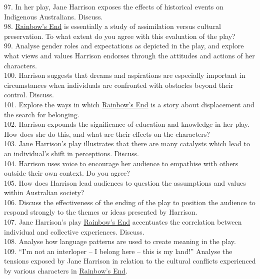 \documentclass[a4paper]{article}
\begin{document}
97. In her play, Jane Harrison exposes the effects of historical events on Indigenous Australians. Discuss.\\

98. \underline{Rainbow’s End} is essentially a study of assimilation versus cultural preservation. To what extent do you agree with this evaluation of the play?\\

99. Analyse gender roles and expectations as depicted in the play, and explore what views and values Harrison endorses through the attitudes and actions of her characters.\\

100. Harrison suggests that dreams and aspirations are especially important in circumstances when individuals are confronted with obstacles beyond their control. Discuss.\\

101. Explore the ways in which \underline{Rainbow’s End} is a story about displacement and the search for belonging.\\

102. Harrison expounds the significance of education and knowledge in her play. How does she do this, and what are their effects on the characters?\\

103. Jane Harrison’s play illustrates that there are many catalysts which lead to an individual’s shift in perceptions. Discuss.\\

104. Harrison uses voice to encourage her audience to empathise with others outside their own context. Do you agree?\\

105. How does Harrison lead audiences to question the assumptions and values within Australian society?\\

106. Discuss the effectiveness of the ending of the play to position the audience to respond strongly to the themes or ideas presented by Harrison.\\

107. Jane Harrison’s play \underline{Rainbow’s End} accentuates the correlation between individual and collective experiences. Discuss.\\

108. Analyse how language patterns are used to create meaning in the play.\\

109. “I’m not an interloper – I belong here – this is my land!” Analyse the tensions exposed by Jane Harrison in relation to the cultural conflicts experienced by various characters in \underline{Rainbow’s End}.\\
\end{document}
